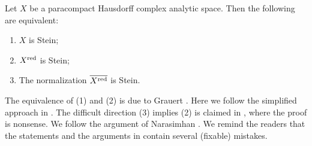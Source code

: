 \begin{corollary}\label{cor-Steinnorm}
    Let $X$ be a paracompact Hausdorff complex analytic space. Then the following are equivalent:
    \begin{enumerate}
        \item $X$ is Stein;
        \item $X^{\operatorname{red}}$ is Stein;
        \item The normalization $\overline{X^{\operatorname{red}}}$ is Stein.
    \end{enumerate}
\end{corollary}
The equivalence of (1) and  (2) is due to Grauert \cite{Gra60}. Here we follow the simplified approach in  \cite{GR77}.
The difficult direction (3) implies  (2) is claimed in \cite{GR77}, where the proof is nonsense. We follow the argument of Narasimhan \cite{Nar62}. We remind the readers that the statements and the arguments in \cite{Nar62} contain several (fixable) mistakes.

